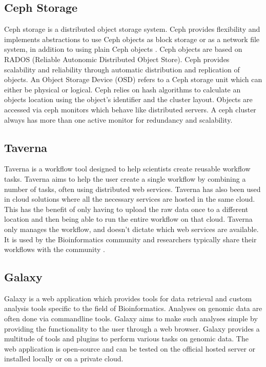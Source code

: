 \documentclass{sig-alternate-05-2015}
\begin{document}
\subsection{Ceph Storage}
Ceph storage is a distributed object storage system. Ceph provides flexibility and implements abstractions to use Ceph objects as block storage or as a network file system, in addition to using plain Ceph objects \cite{wang2013performance}. Ceph objects are based on RADOS (Reliable Autonomic Distributed Object Store). Ceph provides scalability and reliability through automatic distribution and replication of objects. An Object Storage Device (OSD) refers to a Ceph storage unit which can either be physical or logical. Ceph relies on hash algorithms to calculate an objects location using the object's identifier and the cluster layout. Objects are accessed via ceph monitors which behave like distributed servers. A ceph cluster always has more than one active monitor for redundancy and scalability.


\subsection{Taverna}
Taverna is a workflow tool designed to help scientists create reusable workflow tasks. Taverna aims to help the user create a single workflow by combining a number of tasks, often using distributed web services. Taverna has also been used in cloud solutions where all the necessary services are hosted in the same cloud. This has the benefit of only having to upload the raw data once to a different location and then being able to run the entire workflow on that cloud. Taverna only manages the workflow, and doesn't dictate which web services are available. It is used by the Bioinformatics community and researchers typically share their workflows with the community \cite{wolstencroft2013taverna}.

\subsection{Galaxy}
Galaxy is a web application which provides tools for data retrieval and custom analysis tools specific to the field of Bioinformatics. Analyses on genomic data are often done via commandline tools. Galaxy aims to make such analyses simple by providing the functionality to the user through a web browser. Galaxy provides a multitude of tools and plugins to perform various tasks on genomic data.  The web application is open-source and can be tested on the official hosted server or installed locally or on a private cloud\cite{hillman2012using}.
\end{document}
